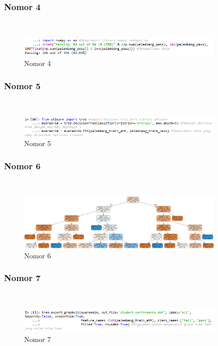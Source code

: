 \subsubsection{Nomor 4}
\hfill\\

\begin{figure}[H]
\centerline{\includegraphics[width=10cm]{figures/1174087/2/p4.png}}
\caption{Nomor 4}
\label{labelgambar}
\end{figure}

\subsubsection{Nomor 5}
\hfill\\

\begin{figure}[H]
\centerline{\includegraphics[width=10cm]{figures/1174087/2/p5.png}}
\caption{Nomor 5}
\label{labelgambar}
\end{figure}

\subsubsection{Nomor 6}
\hfill\\

\begin{figure}[H]
\centerline{\includegraphics[width=10cm]{figures/1174087/2/p6.png}}
\caption{Nomor 6}
\label{labelgambar}
\end{figure}

\subsubsection{Nomor 7}
\hfill\\

\begin{figure}[H]
\centerline{\includegraphics[width=10cm]{figures/1174087/2/p7.png}}
\caption{Nomor 7}
\label{labelgambar}
\end{figure}

